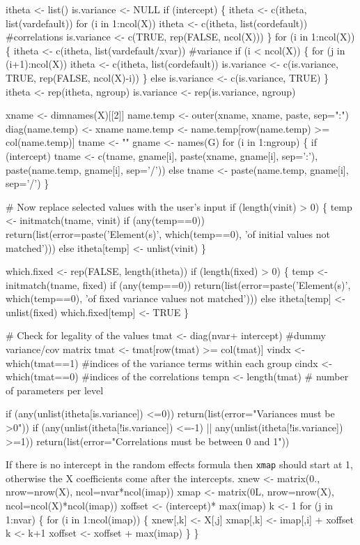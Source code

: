 \documentclass{article}
\begin{document}
itheta <- list()
is.variance <- NULL
if (intercept) \{
    itheta <- c(itheta, list(vardefault))
    for (i in 1:ncol(X)) itheta <- c(itheta, list(cordefault))  #correlations
    is.variance <- c(TRUE, rep(FALSE, ncol(X)))
    \}
for (i in 1:ncol(X)) \{
    itheta <- c(itheta, list(vardefault/xvar))  #variance
    if (i < ncol(X)) \{
        for (j in (i+1):ncol(X))  itheta <- c(itheta, list(cordefault))
        is.variance <- c(is.variance, TRUE, rep(FALSE, ncol(X)-i))
        \}
    else is.variance <- c(is.variance, TRUE)
    \}
itheta <- rep(itheta, ngroup)
is.variance <- rep(is.variance, ngroup)    
    
xname <- dimnames(X)[[2]]
name.temp <- outer(xname, xname, paste, sep=":")
diag(name.temp) <- xname
name.temp <- name.temp[row(name.temp) >= col(name.temp)]
tname <- ""
gname <- names(G)
for (i in 1:ngroup) \{
    if (intercept)
        tname <- c(tname, gname[i], paste(xname, gname[i], sep=':'),
                   paste(name.temp, gname[i], sep='/'))
    else tname <- paste(name.temp, gname[i], sep='/')
    \}

# Now replace selected values with the user's input
if (length(vinit) > 0) \{
    temp <- initmatch(tname, vinit)
    if (any(temp==0))
        return(list(error=paste('Element(s)', which(temp==0),
                                'of initial values not matched')))
    else itheta[temp] <- unlist(vinit)
    \}
              
which.fixed <- rep(FALSE, length(itheta))
if (length(fixed) > 0) \{
    temp <- initmatch(tname, fixed)
    if (any(temp==0))
      return(list(error=paste('Element(s)', which(temp==0),
                              'of fixed variance values not matched')))
    else itheta[temp] <- unlist(fixed)
    which.fixed[temp] <- TRUE
    \}

# Check for legality of the values
tmat <- diag(nvar+ intercept)  #dummy variance/cov matrix
tmat <- tmat[row(tmat) >= col(tmat)]
vindx <- which(tmat==1)  #indices of the variance terms within each group
cindx <- which(tmat==0)  #indices of the correlations
tempn <- length(tmat)   # number of parameters per level

if (any(unlist(itheta[is.variance]) <=0)) 
        return(list(error="Variances must be >0"))
if (any(unlist(itheta[!is.variance]) <=-1) || any(unlist(itheta[!is.variance]) >=1))
        return(list(error="Correlations must be between 0 and 1"))
\nwendcode{}\nwdocspar

If there is no intercept in the random effects formula then {\tt{}xmap} should
start at 1, otherwise the X coefficients come after the intercepts.
\nwenddocs{}\plusendmoddef
xnew <- matrix(0., nrow=nrow(X), ncol=nvar*ncol(imap))
xmap <- matrix(0L, nrow=nrow(X), ncol=ncol(X)*ncol(imap))
xoffset <- (intercept)* max(imap)
k <- 1
for (j in 1:nvar) \{
    for (i in 1:ncol(imap)) \{ 
        xnew[,k] <- X[,j]
        xmap[,k] <- imap[,i] + xoffset
        k <- k+1
        xoffset <- xoffset + max(imap)
        \}
    \}
\end{document}

